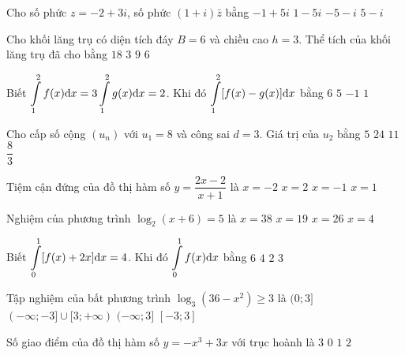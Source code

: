 \begin{ex}%
Cho số phức $z=-2+3 i$, số phức $(1+i) \bar{z}$ bằng
\choice
{$-1+5 i$}
{\True $1-5 i$}
{$-5-i$}
{$5-i$}

\end{ex}
\begin{ex}%
Cho khối lăng trụ có diện tích đáy $B=6$ và chiều cao $h=3$. Thể tích của khối lăng trụ đã cho bằng
\choice
{\True $18$}
{$3$}
{$9$}
{$6$}

\end{ex}
\begin{ex}%
Biết $\displaystyle\displaystyle\int\limits_1^2 f(x) \mathrm{d} x=3\displaystyle\displaystyle\int\limits_1^2 g(x) \mathrm{d} x=2$. Khi đó $\displaystyle\displaystyle\int\limits_1^2[f(x)-g(x)] \mathrm{d} x$ bằng
\choice
{$6$}
{$5$}
{$-1$}
{\True $1$}

\end{ex}
\begin{ex}%
Cho cấp số cộng $\left(u_n\right)$ với $u_1=8$ và công sai $d=3$. Giá trị của $u_2$ bằng
\choice
{$5$}
{$24$}
{\True $11$}
{$\dfrac{8}{3}$}

\end{ex}
\begin{ex}%
Tiệm cận đứng của đồ thị hàm số $y=\dfrac{2 x-2}{x+1}$ là
\choice
{$x=-2$}
{$x=2$}
{\True $x=-1$}
{$x=1$}

\end{ex}
\begin{ex}%
Nghiệm của phương trình $\log_2(x+6)=5$ là
\choice
{$x=38$}
{$x=19$}
{\True $x=26$}
{$x=4$}

\end{ex}
\begin{ex}%
Biết $\displaystyle\displaystyle\int\limits_0^1[f(x)+2 x] \mathrm{d} x=4$. Khi đó $\displaystyle\displaystyle\int\limits_0^1 f(x) \mathrm{d} x$ bằng
\choice
{$6$}
{$4$}
{$2$}
{\True $3$}

\end{ex}
\begin{ex}%
Tập nghiệm của bất phương trình $\log_3\left(36-x^2\right) \geq 3$ là
\choice
{$(0; 3]$}
{$(-\infty;-3] \cup[3;+\infty)$}
{$(-\infty; 3]$}
{\True $[-3; 3]$}

\end{ex}
\begin{ex}%
Số giao điểm của đồ thị hàm số $y=-x^3+3 x$ với trục hoành là
\choice
{\True $3$}
{$0$}
{$1$}
{$2$}

\end{ex}
